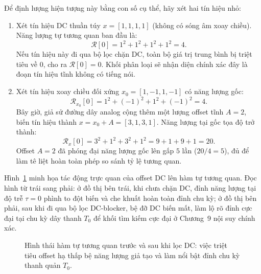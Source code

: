 Để định lượng hiện tượng này bằng con số cụ thể, hãy xét hai tín hiệu nhỏ:
\begin{enumerate}
    \item Xét tín hiệu DC thuần túy $x = [1, 1, 1, 1]$ (không có sóng âm xoay chiều). Năng lượng tự tương quan ban đầu là:
    \[
    \mathcal{R}[0] = 1^2 + 1^2 + 1^2 + 1^2 = 4.
    \]
    Nếu tín hiệu này đi qua bộ lọc chặn DC, toàn bộ giá trị trung bình bị triệt tiêu về $0$, cho ra $\mathcal{R}[0] = 0$. Khối phân loại sẽ nhận diện chính xác đây là đoạn tín hiệu tĩnh không có tiếng nói.
    \item Xét tín hiệu xoay chiều đối xứng $x_0 = [1, -1, 1, -1]$ có năng lượng gốc:
    \[
    \mathcal{R}_{x_0}[0] = 1^2 + (-1)^2 + 1^2 + (-1)^2 = 4.
    \]
    Bây giờ, giả sử đường dây analog cộng thêm một lượng offset tĩnh $A = 2$, biến tín hiệu thành $x = x_0 + A = [3, 1, 3, 1]$. Năng lượng tại gốc tọa độ trở thành:
    \[
    \mathcal{R}_{x}[0] = 3^2 + 1^2 + 3^2 + 1^2 = 9 + 1 + 9 + 1 = 20.
    \]
    Offset $A = 2$ đã phóng đại năng lượng gốc lên gấp $5$ lần ($20 / 4 = 5$), đủ để làm tê liệt hoàn toàn phép so sánh tỷ lệ tương quan.
\end{enumerate}

Hình~\ref{fig:ch03_dc_before_after} minh họa tác động trực quan của offset DC lên hàm tự tương quan. Đọc hình từ trái sang phải: ở đồ thị bên trái, khi chưa chặn DC, đỉnh năng lượng tại độ trễ $\tau = 0$ phình to đột biến và che khuất hoàn toàn đỉnh chu kỳ; ở đồ thị bên phải, sau khi đi qua bộ lọc DC-blocker, bệ đỡ DC biến mất, làm lộ rõ đỉnh cực đại tại chu kỳ dây thanh $T_0$ để khối tìm kiếm cực đại ở Chương~9 nội suy chính xác.

\begin{figure}[H]
\centering
{}
\caption{Hình thái hàm tự tương quan trước và sau khi lọc DC: việc triệt tiêu offset hạ thấp bệ năng lượng giả tạo và làm nổi bật đỉnh chu kỳ thanh quản $T_0$.}
\label{fig:ch03_dc_before_after}
\end{figure}

